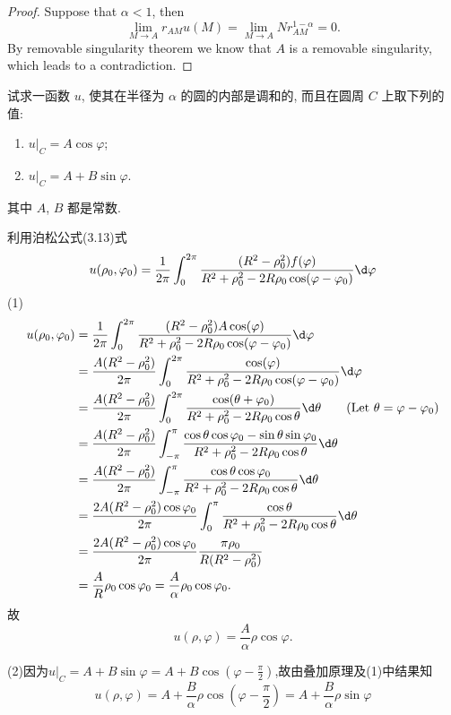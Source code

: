 \begin{proof}
  Suppose that $\alpha<1$, then
  \[\lim_{M\to A}r_{AM}u(M) = \lim_{M\to A}Nr_{AM}^{1-\alpha} = 0.\]
  By removable singularity theorem we know that $A$ is a removable singularity,
  which leads to a contradiction.
\end{proof}


\begin{exercise}
  试求一函数 $u$, 使其在半径为 $\alpha$ 的圆的内部是调和的,
  而且在圆周 $C$ 上取下列的值:
  \begin{enumerate}[(1)]
    \item $u|_C = A\cos\varphi$;
    \item $u|_C = A + B\sin\varphi$.
  \end{enumerate}
  其中 $A$, $B$ 都是常数.
\end{exercise}


\begin{solution}
  利用泊松公式(3.13)式
  \[u(\rho_0,\varphi_0)=\frac{1}{2\pi}\int_0^{2\pi}\frac{(R^2-\rho_0^2)f(\varphi)}{R^2+\rho_0^2-2R\rho_0\cos(\varphi-\varphi_0)}\d\varphi\]
  (1)
  \begin{align*}
    u(\rho_0,\varphi_0)
    & = \frac{1}{2\pi}\int_0^{2\pi}\frac{(R^2-\rho_0^2)A\cos(\varphi)}{R^2+\rho_0^2-2R\rho_0\cos(\varphi-\varphi_0)}\d\varphi \\
    & = \frac{A(R^2-\rho_0^2)}{2\pi}\int_0^{2\pi}\frac{\cos(\varphi)}{R^2+\rho_0^2-2R\rho_0\cos(\varphi-\varphi_0)}\d\varphi \\
    & = \frac{A(R^2-\rho_0^2)}{2\pi}\int_{0}^{2\pi}\frac{\cos(\theta+\varphi_0)}{R^2+\rho_0^2-2R\rho_0\cos\theta}\d\theta \qquad (\text{Let}\ \theta=\varphi-\varphi_0) \\
    & = \frac{A(R^2-\rho_0^2)}{2\pi}\int_{-\pi}^{\pi}\frac{\cos\theta\cos\varphi_0-\sin\theta\sin\varphi_0}{R^2+\rho_0^2-2R\rho_0\cos\theta}\d\theta \\
    & = \frac{A(R^2-\rho_0^2)}{2\pi}\int_{-\pi}^{\pi}\frac{\cos\theta\cos\varphi_0}{R^2+\rho_0^2-2R\rho_0\cos\theta}\d\theta \\
    & = \frac{2A(R^2-\rho_0^2)\cos\varphi_0}{2\pi}\int_0^{\pi}\frac{\cos\theta}{R^2+\rho_0^2-2R\rho_0\cos\theta}\d\theta \\
    & = \frac{2A(R^2-\rho_0^2)\cos\varphi_0}{2\pi}\frac{\pi\rho_0}{R(R^2-\rho_0^2)} \\
    & = \frac{A}{R}\rho_0\cos\varphi_0=\frac{A}{\alpha}\rho_0\cos\varphi_0.
  \end{align*}
  故
  \[u(\rho,\varphi)=\frac{A}{\alpha}\rho\cos\varphi.\]

  (2)因为$u|_C=A+B\sin\varphi=A+B\cos(\varphi-\frac{\pi}{2})$,故由叠加原理及(1)中结果知
  \[u(\rho,\varphi)=A+\frac{B}{\alpha}\rho\cos\left(\varphi-\frac{\pi}{2}\right)=A+\frac{B}{\alpha}\rho\sin\varphi\]
\end{solution}


